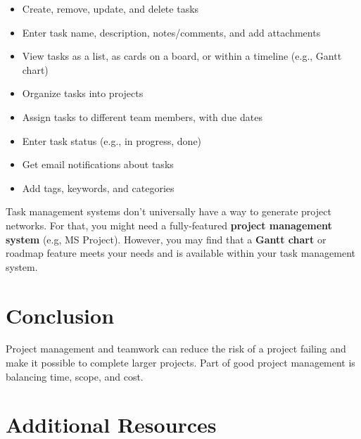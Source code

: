 \begin{itemize}
    \item Create, remove, update, and delete tasks\marginpar{\projectManagementSystemDef\margindivider}\marginpar{\ganttChartDef}
    \item Enter task name, description, notes/comments, and add attachments
    \item View tasks as a list, as cards on a board, or within a timeline (e.g., Gantt chart)
    \item Organize tasks into projects
    \item Assign tasks to different team members, with due dates
    \item Enter task status (e.g., in progress, done)
    \item Get email notifications about tasks
    \item Add tags, keywords, and categories
\end{itemize}

Task management systems don't universally have a way to generate project networks. For that, you might need a fully-featured \textbf{project management system} (e.g, MS Project). However, you may find that a \textbf{Gantt chart} or roadmap feature meets your needs and is available within your task management system.

\section{Conclusion}
Project management and teamwork can reduce the risk of a project failing and make it possible to complete larger projects. Part of good project management is balancing time, scope, and cost.

\nomargins
\section{Additional Resources}

